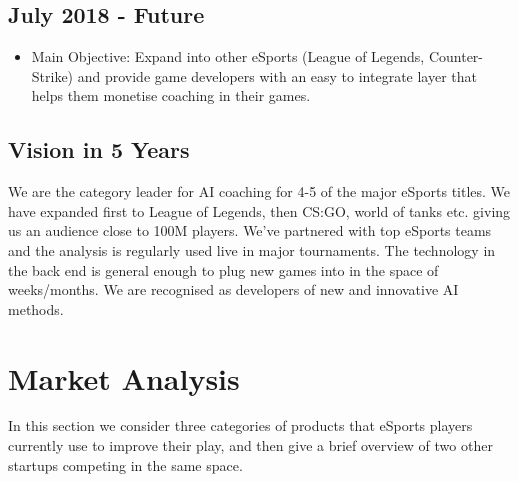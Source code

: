 \documentclass[12pt]{article} %
\let\oldsection\section
\renewcommand\section{\clearpage\oldsection}
\begin{document}
\subsection[{July 2018 - Future}]{July 2018 - Future}
\begin{itemize}
\item Main Objective: Expand into other eSports (League of Legends, Counter-Strike) and provide game developers with an easy to integrate layer that helps them monetise coaching in their games.
\end{itemize}

\subsection{Vision in 5 Years} 
We are the category leader for AI coaching for 4-5 of the major eSports titles. We have expanded first to League of Legends, then CS:GO, world of tanks etc. giving us an audience close to 100M players. We've partnered with top eSports teams and the analysis is regularly used live in major tournaments. The technology in the back end is general enough to plug new games into in the space of weeks/months. We are recognised as developers of new and innovative AI methods.

\section{Market Analysis}
 
In this section we consider three categories of products that eSports players currently use to improve their play, and then give a brief overview of two other startups competing in the same space.
 
\end{document}
